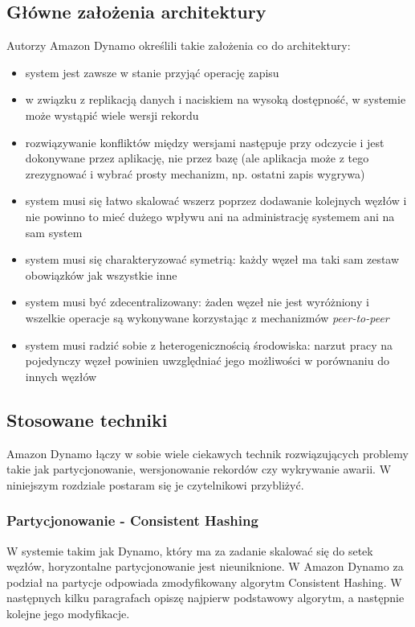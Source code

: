 \subsection*{Główne założenia architektury}

Autorzy Amazon Dynamo określili takie założenia co do architektury:

\begin{itemize}
 \item system jest zawsze w stanie przyjąć operację zapisu
 \item w związku z replikacją danych i naciskiem na wysoką dostępność, w systemie może wystąpić wiele wersji rekordu
 \item rozwiązywanie konfliktów między wersjami następuje przy odczycie i jest dokonywane przez aplikację, nie przez bazę (ale aplikacja może z tego zrezygnować i wybrać prosty mechanizm, np. ostatni zapis wygrywa)
 \item system musi się łatwo skalować wszerz poprzez dodawanie kolejnych węzłów i nie powinno to mieć dużego wpływu ani na administrację systemem ani na sam system
 \item system musi się charakteryzować symetrią: każdy węzeł ma taki sam zestaw obowiązków jak wszystkie inne
 \item system musi być zdecentralizowany: żaden węzeł nie jest wyróżniony i wszelkie operacje są wykonywane korzystając z mechanizmów \emph{peer-to-peer}
 \item system musi radzić sobie z heterogenicznością środowiska: narzut pracy na pojedynczy węzeł powinien uwzględniać jego możliwości w porównaniu do innych węzłów
\end{itemize}

\subsection*{Stosowane techniki}

Amazon Dynamo łączy w sobie wiele ciekawych technik rozwiązujących problemy takie jak partycjonowanie, wersjonowanie rekordów czy wykrywanie awarii.
W niniejszym rozdziale postaram się je czytelnikowi przybliżyć.

\subsubsection*{Partycjonowanie - Consistent Hashing} 

W systemie takim jak Dynamo, który ma za zadanie skalować się do setek węzłów, horyzontalne partycjonowanie jest nieuniknione.
W Amazon Dynamo za podział na partycje odpowiada zmodyfikowany algorytm Consistent Hashing.
W następnych kilku paragrafach opiszę najpierw podstawowy algorytm, a następnie kolejne jego modyfikacje.


